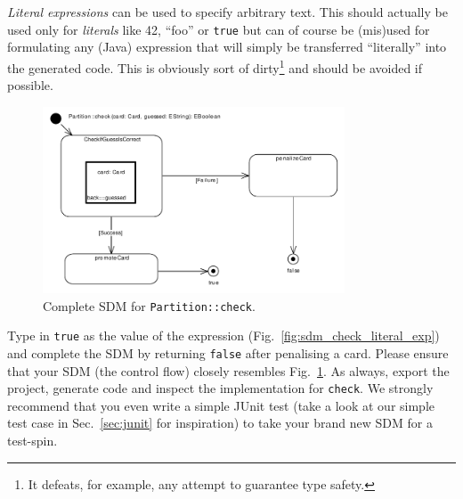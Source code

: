 \emph{Literal expressions} can be used
to specify arbitrary text.  This should actually be used only for
\emph{literals} like 42, ``foo'' or \texttt{true} but can of course be (mis)used
for formulating any (Java) expression that will simply be transferred
``literally'' into the  generated code. This is obviously sort of
dirty\footnote{It defeats, for example, any attempt to guarantee type safety.}
and should be avoided if possible.

\begin{figure}[htbp]
\begin{center}
  \includegraphics[width=0.8\textwidth]{pics/sdmBilder/check/sdm40}
  \caption{Complete SDM for \texttt{Partition::check}.}
  \label{fig:sdm_check_finish}
\end{center}
\end{figure}

Type in \texttt{true} as the value of the expression
(Fig.~\ref{fig:sdm_check_literal_exp}) and complete the SDM by returning
\texttt{false} after penalising a card.  Please ensure that your SDM (the
control flow) closely resembles Fig.~\ref{fig:sdm_check_finish}.  As always,
export the project, generate code and inspect the implementation for
\texttt{check}.  We strongly recommend that you even write a simple JUnit test
(take a look at our simple test case in Sec.~\ref{sec:junit} for inspiration)
to take your brand new SDM for a test-spin.
